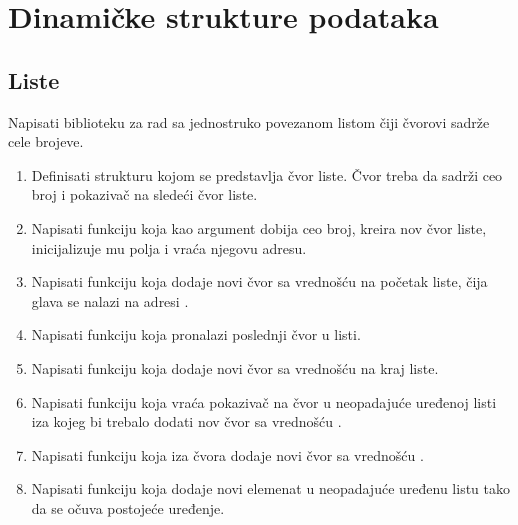
\chapter{Dinamičke strukture podataka}

\section{Liste}

\begin{Exercise}[label=4_01]
Napisati biblioteku za rad sa jednostruko povezanom listom čiji čvorovi sadrže cele brojeve. 
\begin{enumerate}
\item Definisati strukturu  kojom se predstavlja čvor liste. Čvor treba da sadrži ceo broj  i pokazivač na sledeći čvor liste.

\item Napisati funkciju  koja kao argument dobija ceo broj, kreira nov čvor liste, inicijalizuje mu polja i vraća njegovu adresu.

 \item Napisati funkciju  koja dodaje novi čvor sa vrednošću  na početak liste, čija glava se nalazi na adresi .

 \item Napisati funkciju  koja pronalazi poslednji čvor u listi.

 \item Napisati funkciju  koja dodaje novi čvor sa vrednošću  na kraj liste.

 \item Napisati funkciju  koja vraća pokazivač na čvor u neopadajuće uređenoj listi iza kojeg bi trebalo dodati nov čvor sa vrednošću .

 \item Napisati funkciju  koja iza čvora  dodaje novi čvor sa vrednošću .

 \item Napisati funkciju  koja dodaje novi elemenat u neopadajuće uređenu listu tako da se očuva postojeće uređenje.


\end{enumerate}
\end{Exercise}
